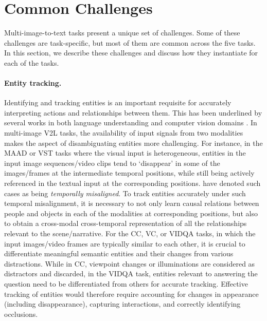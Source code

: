 \section{Common Challenges}
\label{sec:challenges}

Multi-image-to-text tasks present a unique set of challenges. Some of these challenges are task-specific, but most of them are common across the five tasks. In this section, we describe these challenges and discuss how they instantiate for each of the tasks.

\paragraph{Entity tracking.}
Identifying and tracking entities is an important requisite for accurately interpreting actions and relationships between them. This has been underlined by several works in both language understanding \cite{et_lm1,et_lm2} and computer vision domains \cite{et_vm1,et_vm2}. In multi-image V2L tasks, the availability of input signals from two modalities makes the aspect of disambiguating entities more challenging. For instance, in the \color{xkcdVividBlue}MAAD \color{black} or \color{xkcdVividBlue}VST \color{black} tasks where the visual input is heterogeneous, entities in the input image sequences/video clips tend to `disappear' in some of the images/frames at the intermediate temporal positions, while still being actively referenced in the textual input at the corresponding positions. \citet{groovist} have denoted such cases as being \textit{temporally misaligned}. To track entities accurately under such temporal misalignment, it is necessary to not only learn causal relations between people and objects in each of the modalities at corresponding positions, but also to obtain a cross-modal cross-temporal representation of all the relationships relevant to the scene/narrative. For the \color{xkcdVividBlue}CC\color{black}, \color{xkcdVividBlue}VC\color{black}, or \color{xkcdVividBlue}VIDQA \color{black} tasks, in which the input images/video frames are typically similar to each other, it is crucial to differentiate meaningful semantic entities and their changes from various distractions. While in \color{xkcdVividBlue}CC\color{black}, viewpoint changes or illuminations are considered as distractors and discarded, in the \color{xkcdVividBlue}VIDQA \color{black} task, entities relevant to answering the question need to be differentiated from others for accurate tracking. Effective tracking of entities would therefore require accounting for changes in appearance (including disappearance), capturing interactions, and correctly identifying occlusions.

